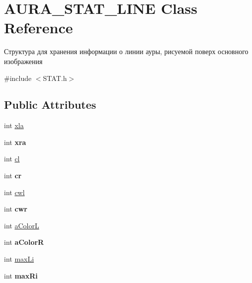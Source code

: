 \hypertarget{class_a_u_r_a___s_t_a_t___l_i_n_e}{\section{A\+U\+R\+A\+\_\+\+S\+T\+A\+T\+\_\+\+L\+I\+N\+E Class Reference}
\label{class_a_u_r_a___s_t_a_t___l_i_n_e}
}


Структура для хранения информации о линии ауры, рисуемой поверх основного изображения  




{\ttfamily \#include $<$S\+T\+A\+T.\+h$>$}

\subsection*{Public Attributes}
\begin{DoxyCompactItemize}
\item 
int \hyperlink{class_a_u_r_a___s_t_a_t___l_i_n_e_a42c234346457efdd753d71f9305fcf77}{xla}
\item 
\hypertarget{class_a_u_r_a___s_t_a_t___l_i_n_e_a762bbdc4a68ca7a4840af6a0dde12bce}{int {\bfseries xra}}\label{class_a_u_r_a___s_t_a_t___l_i_n_e_a762bbdc4a68ca7a4840af6a0dde12bce}

\item 
int \hyperlink{class_a_u_r_a___s_t_a_t___l_i_n_e_af89b81c9dd28cf19cf058790ebf2c531}{cl}
\item 
\hypertarget{class_a_u_r_a___s_t_a_t___l_i_n_e_a3815eba2e0521aa84067eda166157c7b}{int {\bfseries cr}}\label{class_a_u_r_a___s_t_a_t___l_i_n_e_a3815eba2e0521aa84067eda166157c7b}

\item 
int \hyperlink{class_a_u_r_a___s_t_a_t___l_i_n_e_a99860ef5a6830df0434e8a5b77375845}{cwl}
\item 
\hypertarget{class_a_u_r_a___s_t_a_t___l_i_n_e_af9b2244cf6a0c15a355a49633b3d3a98}{int {\bfseries cwr}}\label{class_a_u_r_a___s_t_a_t___l_i_n_e_af9b2244cf6a0c15a355a49633b3d3a98}

\item 
int \hyperlink{class_a_u_r_a___s_t_a_t___l_i_n_e_abec39aa811f1c49d36f0c1595e5b7f70}{a\+Color\+L}
\item 
\hypertarget{class_a_u_r_a___s_t_a_t___l_i_n_e_af0e37277699b38ce40ce16fda5971940}{int {\bfseries a\+Color\+R}}\label{class_a_u_r_a___s_t_a_t___l_i_n_e_af0e37277699b38ce40ce16fda5971940}

\item 
int \hyperlink{class_a_u_r_a___s_t_a_t___l_i_n_e_a14c3362ef902d8c9184b745b5482a011}{max\+Li}
\item 
\hypertarget{class_a_u_r_a___s_t_a_t___l_i_n_e_a9673a7697c72d2eab0c78f959e5acc5f}{int {\bfseries max\+Ri}}\label{class_a_u_r_a___s_t_a_t___l_i_n_e_a9673a7697c72d2eab0c78f959e5acc5f}

\end{DoxyCompactItemize}


